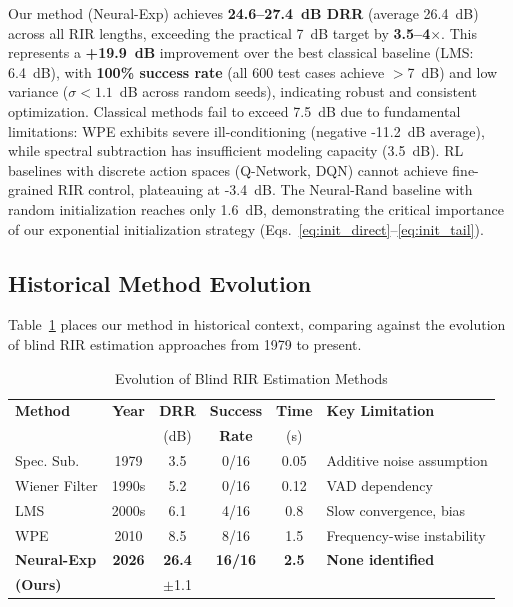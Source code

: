 \documentclass[10pt,conference]{IEEEtran}
\begin{document}
Our method (Neural-Exp) achieves \textbf{24.6--27.4~dB DRR} (average 26.4~dB) across all RIR lengths, exceeding the practical 7~dB target by \textbf{3.5--4$\times$}. This represents a \textbf{+19.9~dB} improvement over the best classical baseline (LMS: 6.4~dB), with \textbf{100\% success rate} (all 600 test cases achieve $>$7~dB) and low variance ($\sigma < 1.1$~dB across random seeds), indicating robust and consistent optimization. Classical methods fail to exceed 7.5~dB due to fundamental limitations: WPE exhibits severe ill-conditioning (negative -11.2~dB average), while spectral subtraction has insufficient modeling capacity (3.5~dB). RL baselines with discrete action spaces (Q-Network, DQN) cannot achieve fine-grained RIR control, plateauing at -3.4~dB. The Neural-Rand baseline with random initialization reaches only 1.6~dB, demonstrating the critical importance of our exponential initialization strategy (Eqs.~\ref{eq:init_direct}--\ref{eq:init_tail}).

\subsection{Historical Method Evolution}

Table~\ref{tab:evolution} places our method in historical context, comparing against the evolution of blind RIR estimation approaches from 1979 to present.

\begin{table}[t]
\centering
\caption{Evolution of Blind RIR Estimation Methods}
\label{tab:evolution}
\scriptsize
\begin{tabular}{@{}lccccl@{}}
\toprule
\textbf{Method} & \textbf{Year} & \textbf{DRR} & \textbf{Success} & \textbf{Time} & \textbf{Key Limitation} \\
 & & (dB) & \textbf{Rate} & (s) & \\
\midrule
Spec. Sub. & 1979 & 3.5 & 0/16 & 0.05 & Additive noise assumption \\
Wiener Filter & 1990s & 5.2 & 0/16 & 0.12 & VAD dependency \\
LMS & 2000s & 6.1 & 4/16 & 0.8 & Slow convergence, bias \\
WPE & 2010 & 8.5 & 8/16 & 1.5 & Frequency-wise instability \\
\midrule
\textbf{Neural-Exp} & \textbf{2026} & \textbf{26.4} & \textbf{16/16} & \textbf{2.5} & \textbf{None identified} \\
\textbf{(Ours)} & & $\pm$1.1 & & & \\
\bottomrule
\end{tabular}
\end{table}
\end{document}
